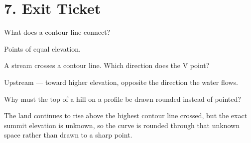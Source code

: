 \documentclass[11pt,addpoints]{exam}
\begin{document}
\section*{7. Exit Ticket}

\begin{questions}

\question[1] What does a contour line connect?
\ifprintanswers
  \par\textcolor{keyblue}{Points of equal elevation.}
\else
  \fillwithlines{0.5in}
\fi

\question[1] A stream crosses a contour line. Which direction does the V point?
\ifprintanswers
  \par\textcolor{keyblue}{Upstream --- toward higher elevation, opposite the direction the water flows.}
\else
  \fillwithlines{0.5in}
\fi

\question[1] Why must the top of a hill on a profile be drawn rounded instead of pointed?
\ifprintanswers
  \par\textcolor{keyblue}{The land continues to rise above the highest contour line crossed, but the exact summit elevation is unknown, so the curve is rounded through that unknown space rather than drawn to a sharp point.}
\else
  \fillwithlines{0.6in}
\fi

\end{questions}
\end{document}
